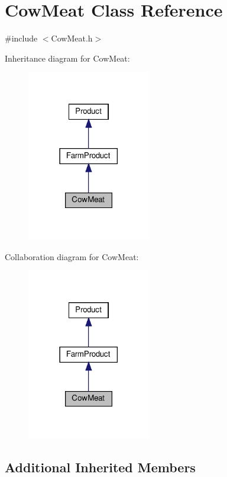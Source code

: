 \hypertarget{classCowMeat}{}\section{Cow\+Meat Class Reference}
\label{classCowMeat}


{\ttfamily \#include $<$Cow\+Meat.\+h$>$}



Inheritance diagram for Cow\+Meat\+:
\nopagebreak
\begin{figure}[H]
\begin{center}
\leavevmode
\includegraphics[width=153pt]{classCowMeat__inherit__graph}
\end{center}
\end{figure}


Collaboration diagram for Cow\+Meat\+:
\nopagebreak
\begin{figure}[H]
\begin{center}
\leavevmode
\includegraphics[width=153pt]{classCowMeat__coll__graph}
\end{center}
\end{figure}
\subsection*{Additional Inherited Members}


